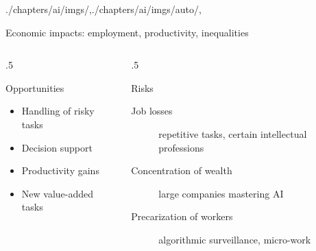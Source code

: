 \begin{graphicspathcontext}{{./chapters/ai/imgs/},{./chapters/ai/imgs/auto/},\old}

\begin{frame}[t]{{Economic impacts:} employment, productivity, inequalities}
	\vspace{-.25cm}
	\begin{columns}[T]
		\begin{column}{.5\linewidth}
			\begin{block}{Opportunities}
				\begin{itemize}
				\item Handling of risky tasks
				\item Decision support
				\item Productivity gains%
				\item New value-added tasks
				\end{itemize}
			\end{block}
		\end{column}
		\begin{column}{.5\linewidth}
			\begin{block}{Risks}
				\begin{description}
				\item[Job losses] repetitive tasks, certain intellectual professions%
				\item[Concentration of wealth] large companies mastering AI%
				\item[Precarization of workers] algorithmic surveillance, micro-work%
				\end{description}
			\end{block}
		\end{column}
	\end{columns}
	\vspace{.5cm}
\end{frame}

\end{graphicspathcontext}

\endinput
